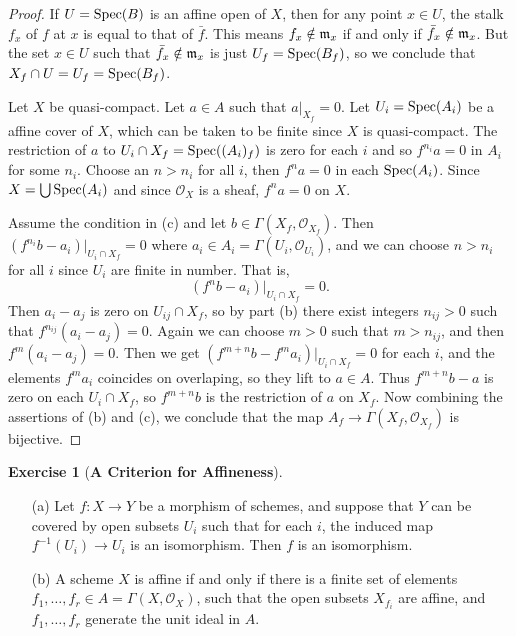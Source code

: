 \documentclass[11pt]{book}
\theoremstyle{definition}
\newtheorem{exercise}{Exercise}[section]
\begin{document}
\begin{proof}
If $U=\mathrm{Spec}(B)$ is an affine open of $X$, then for any point $x\in U$, the stalk $f_x$ of $f$ at $x$ is equal to that of $\bar{f}$. This means $f_x\notin\mathfrak{m}_x$ if and only if $\bar{f}_x\notin\mathfrak{m}_x$. But the set $x\in U$ such that $\bar{f}_x\notin\mathfrak{m}_x$ is just $U_f=\mathrm{Spec}(B_f)$, so we conclude that $X_f\cap U=U_f=\mathrm{Spec}(B_f)$.\par
Let $X$ be quasi-compact. Let $a\in A$ such that $a|_{X_f}=0$. Let $U_i=\mathrm{Spec}(A_i)$ be a affine cover of $X$, which can be taken to be finite since $X$ is quasi-compact. The restriction of $a$ to $U_i\cap X_f=\mathrm{Spec}((A_i)_f)$ is zero for each $i$ and so $f^{n_i}a=0$ in $A_i$ for some $n_i$. Choose an $n>n_i$ for all $i$, then $f^na=0$ in each $\mathrm{Spec}(A_i)$. Since $X=\bigcup\mathrm{Spec}(A_i)$ and since $\mathscr{O}_X$ is a sheaf, $f^na=0$ on $X$.\par
Assume the condition in (c) and let $b\in\Gamma(X_f,\mathscr{O}_{X_f})$. Then $(f^{n_i}b-a_i)|_{U_i\cap X_f}=0$ where $a_i\in A_i=\Gamma(U_i,\mathscr{O}_{U_i})$, and we can choose $n>n_i$ for all $i$ since $U_i$ are finite in number. That is,
\[(f^nb-a_i)|_{U_i\cap X_f}=0.\]
Then $a_i-a_j$ is zero on $U_{ij}\cap X_f$, so by part (b) there exist integers $n_{ij}>0$ such that $f^{n_{ij}}(a_i-a_j)=0$. Again we can choose $m>0$ such that $m>n_{ij}$, and then $f^m(a_i-a_j)=0$. Then we get $(f^{m+n}b-f^ma_i)|_{U_i\cap X_f}=0$ for each $i$, and the elements $f^ma_i$ coincides on overlaping, so they lift to $a\in A$. Thus $f^{m+n}b-a$ is zero on each $U_i\cap X_f$, so $f^{m+n}b$ is the restriction of $a$ on $X_f$. Now combining the assertions of (b) and (c), we conclude that the map $A_f\to\Gamma(X_f,\mathscr{O}_{X_f})$ is bijective.
\end{proof}
\begin{exercise}[\textbf{A Criterion for Affineness}]
\mbox{}
\begin{itemize}
\item[(a)] Let $f:X\to Y$ be a morphism of schemes, and suppose that $Y$ can be covered by open subsets $U_i$ such that for each $i$, the induced map $f^{-1}(U_i)\to U_i$ is an isomorphism. Then $f$ is an isomorphism.
\item[(b)] A scheme $X$ is affine if and only if there is a finite set of elements $f_1,\dots,f_r\in A=\Gamma(X,\mathscr{O}_X)$, such that the open subsets $X_{f_i}$ are affine, and $f_1,\dots,f_r$ generate the unit ideal in $A$.
\end{itemize}
\end{exercise}
\end{document}

